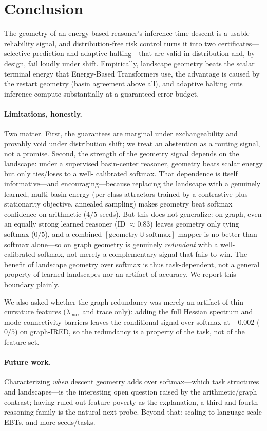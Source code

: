\section{Conclusion}
\label{sec:conclusion}

The geometry of an energy-based reasoner's inference-time descent is a usable reliability signal, and
distribution-free risk control turns it into two certificates---selective prediction and adaptive
halting---that are valid in-distribution and, by design, fail loudly under shift. Empirically,
landscape geometry beats the scalar terminal energy that Energy-Based Transformers use, the advantage
is caused by the restart geometry (basin agreement above all), and adaptive halting cuts inference
compute substantially at a guaranteed error budget.

\paragraph{Limitations, honestly.} Two matter. First, the guarantees are marginal under
exchangeability and provably void under distribution shift; we treat an abstention as a routing
signal, not a promise. Second, the strength of the geometry signal depends on the landscape: under a
supervised basin-center reasoner, geometry beats scalar energy but only ties/loses to a well-%
calibrated softmax. That dependence is itself informative---and encouraging---because replacing the
landscape with a genuinely learned, multi-basin energy (per-class attractors trained by a
contrastive-plus-stationarity objective, annealed sampling) makes geometry beat softmax confidence on
arithmetic ($4/5$ seeds). But this does not generalize: on graph, even an equally strong learned
reasoner (ID $\approx0.83$) leaves geometry only tying softmax ($0/5$), and a combined
$[\text{geometry}\cup\text{softmax}]$ mapper is no better than softmax alone---so on graph geometry
is genuinely \emph{redundant} with a well-calibrated softmax, not merely a complementary signal that
fails to win. The benefit of landscape geometry over softmax is thus task-dependent, not a general
property of learned landscapes nor an artifact of accuracy. We report this boundary plainly.

We also asked whether the graph redundancy was merely an artifact of thin curvature features
($\lambda_{\max}$ and trace only): adding the full Hessian spectrum and mode-connectivity barriers
leaves the conditional signal over softmax at $-0.002$ ($0/5$) on graph-IRED, so the redundancy is a
property of the task, not of the feature set.

\paragraph{Future work.} Characterizing \emph{when} descent geometry adds over softmax---which task
structures and landscapes---is the interesting open question raised by the arithmetic/graph contrast;
having ruled out feature poverty as the explanation, a third and fourth reasoning family is the
natural next probe. Beyond that: scaling to language-scale EBTs, and more seeds/tasks.
